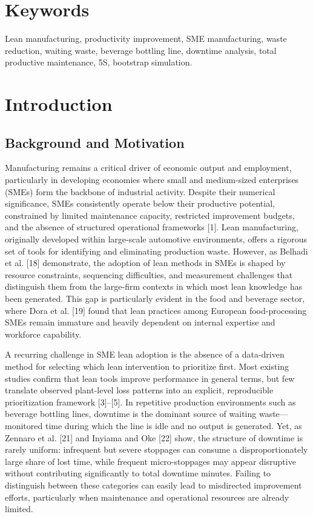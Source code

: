 \documentclass[12pt,a4paper]{article}
\begin{document}
\section*{Keywords}
Lean manufacturing, productivity improvement, SME manufacturing, waste reduction, waiting waste, beverage bottling line, downtime analysis, total productive maintenance, 5S, bootstrap simulation.

\newpage
\section{Introduction}
\subsection{Background and Motivation}
Manufacturing remains a critical driver of economic output and employment, particularly in developing economies where small and medium-sized enterprises (SMEs) form the backbone of industrial activity. Despite their numerical significance, SMEs consistently operate below their productive potential, constrained by limited maintenance capacity, restricted improvement budgets, and the absence of structured operational frameworks [1]. Lean manufacturing, originally developed within large-scale automotive environments, offers a rigorous set of tools for identifying and eliminating production waste. However, as Belhadi et al. [18] demonstrate, the adoption of lean methods in SMEs is shaped by resource constraints, sequencing difficulties, and measurement challenges that distinguish them from the large-firm contexts in which most lean knowledge has been generated. This gap is particularly evident in the food and beverage sector, where Dora et al. [19] found that lean practices among European food-processing SMEs remain immature and heavily dependent on internal expertise and workforce capability.

A recurring challenge in SME lean adoption is the absence of a data-driven method for selecting which lean intervention to prioritize first. Most existing studies confirm that lean tools improve performance in general terms, but few translate observed plant-level loss patterns into an explicit, reproducible prioritization framework [3]--[5]. In repetitive production environments such as beverage bottling lines, downtime is the dominant source of waiting waste---monitored time during which the line is idle and no output is generated. Yet, as Zennaro et al. [21] and Inyiama and Oke [22] show, the structure of downtime is rarely uniform: infrequent but severe stoppages can consume a disproportionately large share of lost time, while frequent micro-stoppages may appear disruptive without contributing significantly to total downtime minutes. Failing to distinguish between these categories can easily lead to misdirected improvement efforts, particularly when maintenance and operational resources are already limited.
\end{document}
